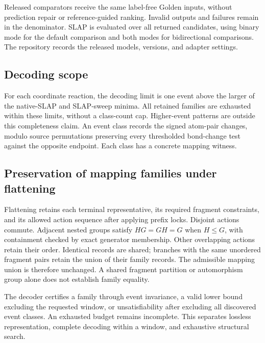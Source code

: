 Released comparators receive the same label-free Golden inputs, without prediction repair or reference-guided ranking. Invalid outputs and failures remain in the denominator. SLAP is evaluated over all returned candidates, using binary mode for the default comparison and both modes for bidirectional comparisons. The repository records the released models, versions, and adapter settings.

\subsection{Decoding scope}

For each coordinate reaction, the decoding limit is one event above the larger of the native-SLAP and SLAP-sweep minima. All \FlatFamilies{} retained families are exhausted within these limits, without a class-count cap. Higher-event patterns are outside this completeness claim. An event class records the signed atom-pair changes, modulo source permutations preserving every thresholded bond-change test against the opposite endpoint. Each class has a concrete mapping witness.

\begin{table}[H]
\centering\small
\caption{\textbf{Complete final decoding on all 140 reactions.} Every retained family is certified within the listed per-case event limit.}

\end{table}

\subsection{Preservation of mapping families under flattening}

Flattening retains each terminal representative, its required fragment constraints, and its allowed action sequence after applying prefix locks. Disjoint actions commute. Adjacent nested groups satisfy $HG=GH=G$ when $H\leq G$, with containment checked by exact generator membership. Other overlapping actions retain their order. Identical records are shared; branches with the same unordered fragment pairs retain the union of their family records. The admissible mapping union is therefore unchanged. A shared fragment partition or automorphism group alone does not establish family equality.

The decoder certifies a family through event invariance, a valid lower bound excluding the requested window, or unsatisfiability after excluding all discovered event classes. An exhausted budget remains incomplete. This separates lossless representation, complete decoding within a window, and exhaustive structural search.

